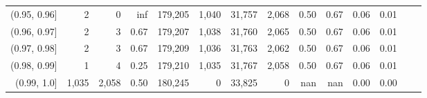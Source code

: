 \begin{tabular}{rrrrrrrrrrrrrr}
(0.95, 0.96]   &       2 &      0 &    inf &  179,205 &    1,040 &  31,757 &   2,068 &  0.50 &  0.67 &  0.06 &      0.01 \\
(0.96, 0.97]   &       2 &      3 &   0.67 &  179,207 &    1,038 &  31,760 &   2,065 &  0.50 &  0.67 &  0.06 &      0.01 \\
(0.97, 0.98]   &       2 &      3 &   0.67 &  179,209 &    1,036 &  31,763 &   2,062 &  0.50 &  0.67 &  0.06 &      0.01 \\
(0.98, 0.99]   &       1 &      4 &   0.25 &  179,210 &    1,035 &  31,767 &   2,058 &  0.50 &  0.67 &  0.06 &      0.01 \\
(0.99, 1.0]    &   1,035 &  2,058 &   0.50 &  180,245 &        0 &  33,825 &       0 &   nan &   nan &  0.00 &      0.00 \\
\bottomrule
\end{tabular}
